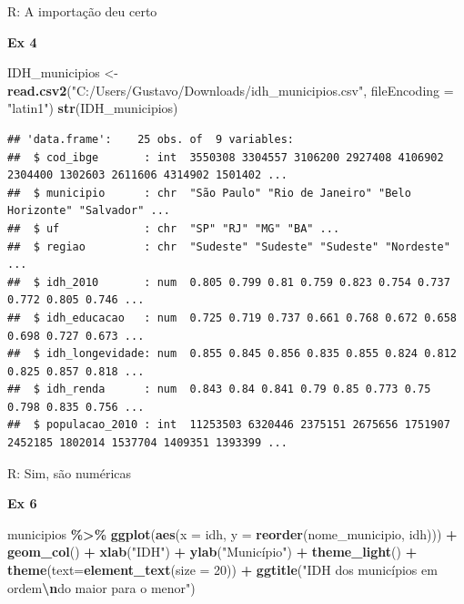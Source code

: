\documentclass[
]{article}
\newenvironment{Shaded}{\begin{snugshade}}{\end{snugshade}}
\newcommand{\AttributeTok}[1]{\textcolor[rgb]{0.13,0.29,0.53}{#1}}
\newcommand{\DecValTok}[1]{\textcolor[rgb]{0.00,0.00,0.81}{#1}}
\newcommand{\FunctionTok}[1]{\textcolor[rgb]{0.13,0.29,0.53}{\textbf{#1}}}
\newcommand{\NormalTok}[1]{#1}
\newcommand{\OtherTok}[1]{\textcolor[rgb]{0.56,0.35,0.01}{#1}}
\newcommand{\SpecialCharTok}[1]{\textcolor[rgb]{0.81,0.36,0.00}{\textbf{#1}}}
\newcommand{\StringTok}[1]{\textcolor[rgb]{0.31,0.60,0.02}{#1}}
\begin{document}
R: A importação deu certo

\textbf{Ex 4}

\begin{Shaded}
\begin{Highlighting}[]
\NormalTok{IDH\_municipios }\OtherTok{\textless{}{-}} \FunctionTok{read.csv2}\NormalTok{(}\StringTok{"C:/Users/Gustavo/Downloads/idh\_municipios.csv"}\NormalTok{,}
                            \AttributeTok{fileEncoding =} \StringTok{"latin1"}\NormalTok{)}
\FunctionTok{str}\NormalTok{(IDH\_municipios)}
\end{Highlighting}
\end{Shaded}

\begin{verbatim}
## 'data.frame':    25 obs. of  9 variables:
##  $ cod_ibge       : int  3550308 3304557 3106200 2927408 4106902 2304400 1302603 2611606 4314902 1501402 ...
##  $ municipio      : chr  "São Paulo" "Rio de Janeiro" "Belo Horizonte" "Salvador" ...
##  $ uf             : chr  "SP" "RJ" "MG" "BA" ...
##  $ regiao         : chr  "Sudeste" "Sudeste" "Sudeste" "Nordeste" ...
##  $ idh_2010       : num  0.805 0.799 0.81 0.759 0.823 0.754 0.737 0.772 0.805 0.746 ...
##  $ idh_educacao   : num  0.725 0.719 0.737 0.661 0.768 0.672 0.658 0.698 0.727 0.673 ...
##  $ idh_longevidade: num  0.855 0.845 0.856 0.835 0.855 0.824 0.812 0.825 0.857 0.818 ...
##  $ idh_renda      : num  0.843 0.84 0.841 0.79 0.85 0.773 0.75 0.798 0.835 0.756 ...
##  $ populacao_2010 : int  11253503 6320446 2375151 2675656 1751907 2452185 1802014 1537704 1409351 1393399 ...
\end{verbatim}

R: Sim, são numéricas

\textbf{Ex 6}

\begin{Shaded}
\begin{Highlighting}[]
\NormalTok{municipios }\SpecialCharTok{\%\textgreater{}\%}
  \FunctionTok{ggplot}\NormalTok{(}\FunctionTok{aes}\NormalTok{(}\AttributeTok{x =}\NormalTok{ idh, }\AttributeTok{y =} \FunctionTok{reorder}\NormalTok{(nome\_municipio, idh))) }\SpecialCharTok{+} \FunctionTok{geom\_col}\NormalTok{() }\SpecialCharTok{+}
  \FunctionTok{xlab}\NormalTok{(}\StringTok{"IDH"}\NormalTok{) }\SpecialCharTok{+} \FunctionTok{ylab}\NormalTok{(}\StringTok{"Município"}\NormalTok{) }\SpecialCharTok{+}
  \FunctionTok{theme\_light}\NormalTok{() }\SpecialCharTok{+} \FunctionTok{theme}\NormalTok{(}\AttributeTok{text=}\FunctionTok{element\_text}\NormalTok{(}\AttributeTok{size =} \DecValTok{20}\NormalTok{)) }\SpecialCharTok{+}
  \FunctionTok{ggtitle}\NormalTok{(}\StringTok{"IDH dos municípios em ordem}\SpecialCharTok{\textbackslash{}n}\StringTok{do maior para o menor"}\NormalTok{)}
\end{Highlighting}
\end{Shaded}
\end{document}
